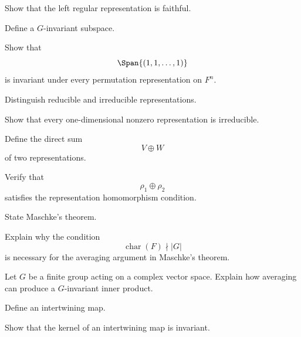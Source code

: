 \begin{exercise}[2]
Show that the left regular representation is faithful.
\end{exercise}

\begin{exercise}[1]
Define a \(G\)-invariant subspace.
\end{exercise}

\begin{exercise}[2]
Show that
\[ \Span\{(1,1,\ldots,1)\} \]
is invariant under every permutation representation on \(F^n\).
\end{exercise}

\begin{exercise}[1]
Distinguish reducible and irreducible representations.
\end{exercise}

\begin{exercise}[2]
Show that every one-dimensional nonzero representation is irreducible.
\end{exercise}

\begin{exercise}[1]
Define the direct sum
\[ V\oplus W \]
of two representations.
\end{exercise}

\begin{exercise}[2]
Verify that
\[ \rho_1\oplus\rho_2 \]
satisfies the representation homomorphism condition.
\end{exercise}

\begin{exercise}[1]
State Maschke's theorem.
\end{exercise}

\begin{exercise}[2]
Explain why the condition
\[ \operatorname{char}(F)\nmid|G| \]
is necessary for the averaging argument in Maschke's theorem.
\end{exercise}

\begin{exercise}[2]
Let \(G\) be a finite group acting on a complex vector space. Explain how
averaging can produce a \(G\)-invariant inner product.
\end{exercise}

\begin{exercise}[1]
Define an intertwining map.
\end{exercise}

\begin{exercise}[2]
Show that the kernel of an intertwining map is invariant.
\end{exercise}

